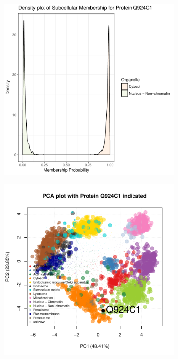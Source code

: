 \documentclass[12pt,english]{article}
\begin{document}
\begin{figure}[h]
\begin{subfigure}[t]{0.5\textwidth}
    \caption{}
  \end{subfigure}
  \vspace{1cm}
  \begin{subfigure}[t]{0.5\textwidth}
    \centering
\includegraphics{tagm-017}
    \caption{}
  \end{subfigure}%
  \begin{subfigure}[t]{0.5\textwidth}
    \centering
\includegraphics{tagm-018}
    \caption{}
  \end{subfigure}


\end{figure}
\end{document}
